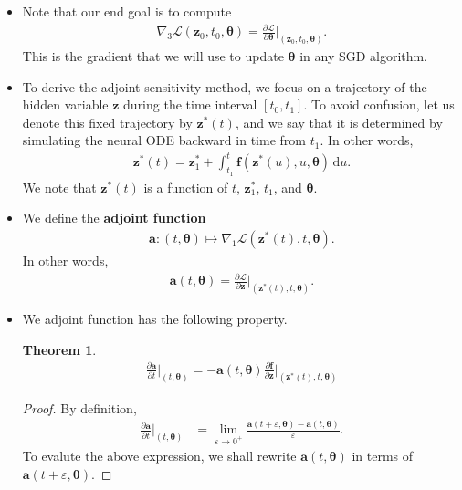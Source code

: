 \documentclass[10pt]{article}
\newtheorem{theorem}[lemma]{Theorem}
\newcommand{\dee}{\mathrm{d}}
\newcommand{\ve}[1]{\mathbf{#1}}
\newcommand{\ves}[1]{\boldsymbol{#1}}
\newcommand{\mcal}[1]{\mathcal{#1}}
\begin{document}
\begin{itemize}
  \item Note that our end goal is to compute
  \begin{align*}
    \nabla_3\mcal{L}(\ve{z}_0, t_0, \ves{\theta}) = \frac{\partial \mcal{L}}{\partial \ves{\theta}}\bigg|_{(\ve{z}_0, t_0, \ves{\theta})}.
  \end{align*}
  This is the gradient that we will use to update $\ves{\theta}$ in any SGD algorithm.
  

  \item To derive the adjoint sensitivity method, we focus on a trajectory of the hidden variable $\ve{z}$ during the time interval $[t_0, t_1]$. To avoid confusion, let us denote this fixed trajectory by $\ve{z}^*(t)$, and we say that it is determined by simulating the neural ODE backward in time from $t_1$. In other words,
  \begin{align*}
    \ve{z}^*(t) = \ve{z}^*_1 + \int_{t_1}^t \ve{f}(\ve{z}^*(u), u, \ves{\theta})\, \dee u.
  \end{align*}
  We note that $\ve{z}^*(t)$ is a function of $t$, $\ve{z}^*_1$, $t_1$, and $\ves{\theta}$.
   
  \item We define the {\bf adjoint function}
  \begin{align*}
    \ve{a}: (t,\ves{\theta}) \mapsto \nabla_1 \mcal{L} (\ve{z}^*(t), t, \ves{\theta}).
  \end{align*}
  In other words,
  \begin{align*}
    \ve{a}(t,\ves{\theta}) = \frac{\partial \mcal{L}}{\partial \ve{z}}\bigg|_{(\ve{z}^*(t), t, \ves{\theta})}.
  \end{align*}

  \item We adjoint function has the following property.
  \begin{theorem}
  \begin{align*}
    \frac{\partial \ve{a}}{\partial t}\bigg|_{(t,\ves{\theta})} = -\ve{a}(t,\ves{\theta}) \frac{\partial \ve{f}}{\partial \ve{z}}\bigg|_{(\ve{z}^*(t), t, \ves{\theta})}
  \end{align*}
  \end{theorem}

  \begin{proof}
    By definition,
    \begin{align*}
      \frac{\partial \ve{a}}{\partial t}\bigg|_{(t,\ves{\theta})}
      &= \lim_{\varepsilon \rightarrow 0^+} \frac{\ve{a}(t+ \varepsilon, \ves{\theta}) - \ve{a}(t, \ves{\theta})}{\varepsilon}.
    \end{align*}
    To evalute the above expression, we shall rewrite $\ve{a}(t,\ves{\theta})$ in terms of $\ve{a}(t+\varepsilon, \ves{\theta})$.


\end{proof}
\end{itemize}
\end{document}
